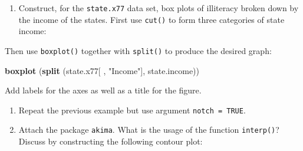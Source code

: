 \documentclass[
]{book}
\newenvironment{Shaded}{\begin{snugshade}}{\end{snugshade}}
\newcommand{\AttributeTok}[1]{\textcolor[rgb]{0.13,0.29,0.53}{#1}}
\newcommand{\ConstantTok}[1]{\textcolor[rgb]{0.56,0.35,0.01}{#1}}
\newcommand{\DecValTok}[1]{\textcolor[rgb]{0.00,0.00,0.81}{#1}}
\newcommand{\FunctionTok}[1]{\textcolor[rgb]{0.13,0.29,0.53}{\textbf{#1}}}
\newcommand{\NormalTok}[1]{#1}
\newcommand{\OtherTok}[1]{\textcolor[rgb]{0.56,0.35,0.01}{#1}}
\newcommand{\SpecialCharTok}[1]{\textcolor[rgb]{0.81,0.36,0.00}{\textbf{#1}}}
\newcommand{\StringTok}[1]{\textcolor[rgb]{0.31,0.60,0.02}{#1}}
\providecommand{\tightlist}{%
  \setlength{\itemsep}{0pt}\setlength{\parskip}{0pt}}
\begin{document}
\begin{enumerate}
\def\labelenumi{(\alph{enumi})}
\setcounter{enumi}{1}
\tightlist
\item
  Construct, for the \texttt{state.x77} data set, box plots of illiteracy broken down by the income of the states. First use \texttt{cut()} to form three categories of state income:
\end{enumerate}

\begin{Shaded}
\end{Shaded}

Then use \texttt{boxplot()} together with \texttt{split()} to produce the desired graph:

\begin{Shaded}
\begin{Highlighting}[]
\FunctionTok{boxplot}\NormalTok{ (}\FunctionTok{split}\NormalTok{ (state.x77[ , }\StringTok{"Income"}\NormalTok{], state.income))}
\end{Highlighting}
\end{Shaded}

Add labels for the axes as well as a title for the figure.

\begin{enumerate}
\def\labelenumi{(\alph{enumi})}
\setcounter{enumi}{2}
\item
  Repeat the previous example but use argument \texttt{notch\ =\ TRUE}.
\item
  Attach the package \texttt{akima}. What is the usage of the function \texttt{interp()}? Discuss by constructing the following contour plot:
\end{enumerate}

\begin{Shaded}
\end{Shaded}
\end{document}
